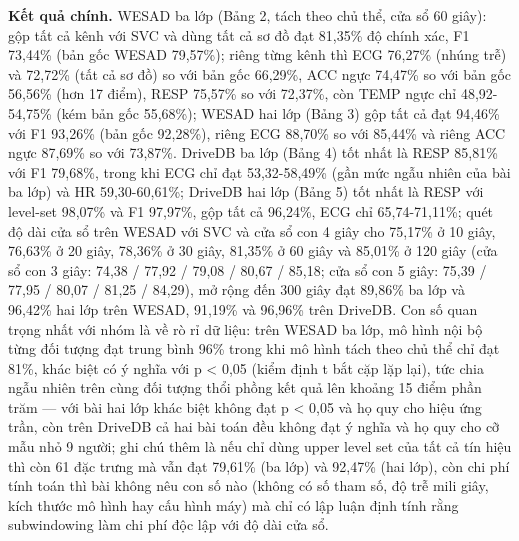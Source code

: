 \documentclass[12pt,a4paper]{article}
\begin{document}
\noindent \textbf{Kết quả chính.} WESAD ba lớp (Bảng 2, tách theo chủ thể, cửa sổ 60 giây): gộp tất cả kênh với SVC và dùng tất cả sơ đồ đạt 81,35\% độ chính xác, F1 73,44\% (bản gốc WESAD 79,57\%); riêng từng kênh thì ECG 76,27\% (nhúng trễ) và 72,72\% (tất cả sơ đồ) so với bản gốc 66,29\%, ACC ngực 74,47\% so với bản gốc 56,56\% (hơn 17 điểm), RESP 75,57\% so với 72,37\%, còn TEMP ngực chỉ 48,92-54,75\% (kém bản gốc 55,68\%); WESAD hai lớp (Bảng 3) gộp tất cả đạt 94,46\% với F1 93,26\% (bản gốc 92,28\%), riêng ECG 88,70\% so với 85,44\% và riêng ACC ngực 87,69\% so với 73,87\%. DriveDB ba lớp (Bảng 4) tốt nhất là RESP 85,81\% với F1 79,68\%, trong khi ECG chỉ đạt 53,32-58,49\% (gần mức ngẫu nhiên của bài ba lớp) và HR 59,30-60,61\%; DriveDB hai lớp (Bảng 5) tốt nhất là RESP với level-set 98,07\% và F1 97,97\%, gộp tất cả 96,24\%, ECG chỉ 65,74-71,11\%; quét độ dài cửa sổ trên WESAD với SVC và cửa sổ con 4 giây cho 75,17\% ở 10 giây, 76,63\% ở 20 giây, 78,36\% ở 30 giây, 81,35\% ở 60 giây và 85,01\% ở 120 giây (cửa sổ con 3 giây: 74,38 / 77,92 / 79,08 / 80,67 / 85,18; cửa sổ con 5 giây: 75,39 / 77,95 / 80,07 / 81,25 / 84,29), mở rộng đến 300 giây đạt 89,86\% ba lớp và 96,42\% hai lớp trên WESAD, 91,19\% và 96,96\% trên DriveDB. Con số quan trọng nhất với nhóm là về rò rỉ dữ liệu: trên WESAD ba lớp, mô hình nội bộ từng đối tượng đạt trung bình 96\% trong khi mô hình tách theo chủ thể chỉ đạt 81\%, khác biệt có ý nghĩa với p < 0,05 (kiểm định t bắt cặp lặp lại), tức chia ngẫu nhiên trên cùng đối tượng thổi phồng kết quả lên khoảng 15 điểm phần trăm — với bài hai lớp khác biệt không đạt p < 0,05 và họ quy cho hiệu ứng trần, còn trên DriveDB cả hai bài toán đều không đạt ý nghĩa và họ quy cho cỡ mẫu nhỏ 9 người; ghi chú thêm là nếu chỉ dùng upper level set của tất cả tín hiệu thì còn 61 đặc trưng mà vẫn đạt 79,61\% (ba lớp) và 92,47\% (hai lớp), còn chi phí tính toán thì bài không nêu con số nào (không có số tham số, độ trễ mili giây, kích thước mô hình hay cấu hình máy) mà chỉ có lập luận định tính rằng subwindowing làm chi phí độc lập với độ dài cửa sổ.\par\vspace{3pt}
\end{document}

